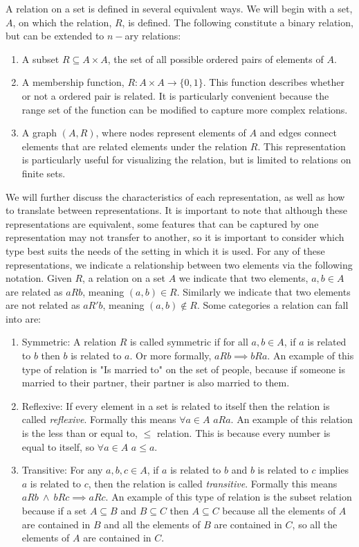 \documentclass{article}
\begin{document}
A relation on a set is defined in several equivalent ways. We will begin with a set, $A$, on which the relation, $R$, is defined. The following constitute a binary relation, but can be extended to $n-$ary relations:
\begin{enumerate}
    \item A subset $ R\subseteq A\times A$, the set of all possible ordered pairs of elements of $A$.
    \item A membership function, $R:A\times A \to \{0,1\}$. This function describes whether or not a ordered pair is related. It is particularly convenient because the range set of the function can be modified to capture more complex relations.
    \item A graph $(A,R)$, where nodes represent elements of $A$ and edges connect elements that are related elements under the relation $R$. This representation is particularly useful for visualizing the relation, but is limited to relations on finite sets.
\end{enumerate}
We will further discuss the characteristics of each representation, as well as how to translate between representations. It is important to note that although these representations are equivalent, some features that can be captured by one representation may not transfer to another, so it is important to consider which type best suits the needs of the setting in which it is used. For any of these representations, we indicate a relationship between two elements via the following notation. Given $R$, a relation on a set $A$ we indicate that two elements, $a,b\in A$ are related as $aRb$, meaning $(a,b)\in R$. Similarly we indicate that two elements are not related as $aR'b$, meaning $(a,b)\notin R$. Some categories a relation can fall into are:
\begin{enumerate}
    \item Symmetric: A relation $R$ is called symmetric if for all $a,b\in A$, if $a$ is related to $b$ then $b$ is related to $a$. Or more formally, $aRb \implies bRa$. An example of this type of relation is "Is married to" on the set of people, because if someone is married to their partner, their partner is also married to them.
    \item Reflexive: If every element in a set is related to itself then the relation is called \emph{reflexive}. Formally this means $\forall a\in A$ $aRa$. An example of this relation is the less than or equal to, $\leq$ relation. This is because every number is equal to itself, so $\forall a\in A$ $a\leq a$. 
    \item Transitive: For any $a,b,c\in A$, if $a$ is related to $b$ and $b$ is related to $c$ implies $a$ is related to $c$, then the relation is called \emph{transitive}. Formally this means $aRb\ \wedge\ bRc\implies aRc$. An example of this type of relation is the subset relation because if a set $A\subseteq B$ and $B\subseteq C$ then $A\subseteq C$ because all the elements of $A$ are contained in $B$ and all the elements of $B$ are contained in $C$, so all the elements of $A$ are contained in $C$.
\end{enumerate}
\end{document}
